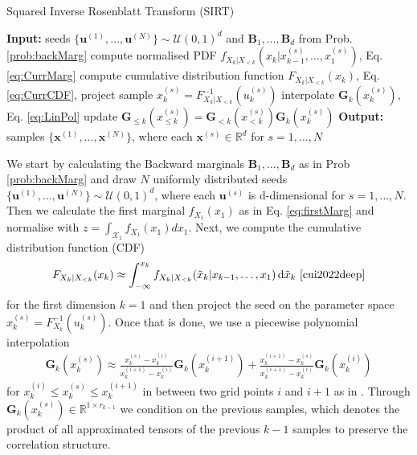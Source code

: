 \begin{algorithm}[!th]
	\caption{Squared Inverse Rosenblatt Transform (SIRT)}
	\begin{algorithmic}[1]
		\STATE \textbf{Input:} seeds $\{ \bm{u}^{(1)},\dots, \bm{u}^{(N)} \} \sim \mathcal{U}(0,1)^d $ and $\bm{B}_1 , \dots,\bm{B}_d$  from Prob. \ref{prob:backMarg}
		\STATE compute normalised PDF $ f_{X_k|X_{<k}}(x_k|x^{(s)}_{k-1},\dots,x^{(s)}_1)$, Eq. \ref{eq:CurrMarg}
		\STATE compute cumulative distribution function $F_{X_k|X_{<k}}(x_k)$, Eq. \ref{eq:CurrCDF},
		\STATE project sample $x^{(s)}_k = F_{X_k|X_{<k}}^{-1}(u^{(s)}_k)$
		\STATE interpolate $\bm{G}_k(x^{(s)}_k)$, Eq. \ref{eq:LinPol}
		\STATE update $\bm{G}_{\leq k}(x^{(s)}_{\leq k}) = \bm{G}_{<k}(x^{(s)}_{<k}) \bm{G}_k(x^{(s)}_k)$
		\ENDFOR
		\ENDFOR
		\STATE \textbf{Output:} samples $\{ \bm{x}^{(1)},\dots, \bm{x}^{(N)} \} $, where each $\bm{x}^{(s)} \in \mathbb{R}^d$ for $s = 1, \dots, N$
	\end{algorithmic}
	\label{alg:SIRT}
\end{algorithm}
We start by calculating the Backward marginals $\bm{B}_1 , \dots,\bm{B}_d$ as in Prob \ref{prob:backMarg} and draw $N$ uniformly distributed seeds $\{ \bm{u}^{(1)},\dots, \bm{u}^{(N)} \} \sim \mathcal{U}(0,1)^d $, where each $\bm{u}^{(s)}$ is d-dimensional for $s = 1, \dots, N$.
Then we calculate the first marginal $f_{X_1}(x_1)$ as in Eq. \ref{eq:firstMarg} and normalise with $z = \int_{\mathcal{X}_1} f_{X_1}(x_1) d x_1$.
Next, we compute the cumulative distribution function (CDF)
\begin{align}
	F_{X_k|X_{<k}}(x_k) \approx \int_{-\infty}^{x_k} f_{X_k|X_{<k}}(\tilde{x}_k|x_{k-1},\dots,x_1) \diff \tilde{x}_k  \, \, \text{\cite[Eq. 17]{cui2022deep}}
	\label{eq:CurrCDF}
\end{align}
for the first dimension $k = 1$ and then project the seed  on the parameter space $x^{(s)}_k = F_{X_k}^{-1}(u^{(s)}_k)$.
Once that is done, we use a piecewise polynomial interpolation
\begin{align}
	\bm{G}_k(x^{(s)}_k) \approx   \frac{x^{(s)}_k - x^{(i)}_k }{x^{(i+1)}_k -x^{(i)}_k } \bm{G}_k(x^{(i+1)}_k) + \frac{ x^{(i+1)}_k - x^{(s)}_k}{x^{(i+1)}_k -x^{(i)}_k } \bm{G}_k(x^{(i)}_k)
	\label{eq:LinPol}
\end{align}
for $x^{(i)}_k \leq x^{(s)}_k \leq x^{(i+1)}_k$ in between two grid points $i$ and $i+1$ as in \cite{dolgov2020approximation}.
Through $\bm{G}_k(x^{(s)}_k)\in \mathbb{R}^{1 \times r_{k-1}}$ we condition on the previous samples, which denotes the product of all approximated tensors of the previous $k-1$ samples to preserve the correlation structure.
